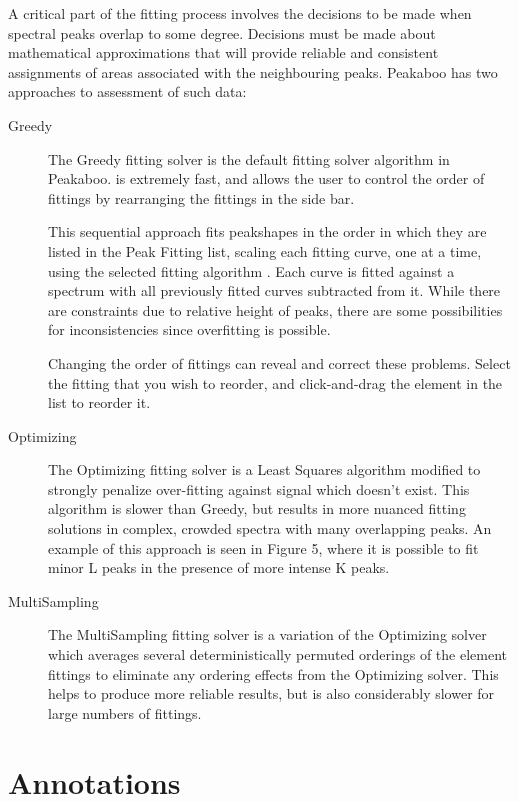 \documentclass[article,twoside,11pt]{report}
\newcommand{\tocsection}[1]{\section*{#1}\addcontentsline{toc}{section}{#1}}
\begin{document}
A critical part of the fitting process involves the decisions to be made when spectral peaks overlap to some degree. Decisions must be made about mathematical approximations that will provide reliable and consistent assignments of areas associated with the neighbouring peaks. Peakaboo has two approaches to assessment of such data: 





\begin{description}

\item [Greedy] The Greedy fitting solver is the default fitting solver algorithm in Peakaboo. is extremely fast, and allows the user to control the order of fittings by rearranging the fittings in the side bar. 

This sequential approach fits peakshapes in the order in which they are listed in the Peak Fitting list, scaling each fitting curve, one at a time, using the selected fitting algorithm . Each curve is fitted against a spectrum with all previously fitted curves subtracted from it. While there are constraints due to relative height of peaks, there are some possibilities for inconsistencies since overfitting is possible. 

Changing the order of fittings can reveal and correct these problems. Select the fitting that you wish to reorder, and click-and-drag the element in the list to reorder it.


\item [Optimizing] The Optimizing fitting solver is a Least Squares algorithm modified to strongly penalize over-fitting against signal which doesn't exist. This algorithm is slower than Greedy, but results in more nuanced fitting solutions in complex, crowded spectra with many overlapping peaks. An example of this approach is seen in Figure 5, where it is possible to fit minor L peaks in the presence of more intense K peaks.

\item [MultiSampling] The MultiSampling fitting solver is a variation of the Optimizing solver which averages several deterministically permuted orderings of the element fittings to eliminate any ordering effects from the Optimizing solver. This helps to produce more reliable results, but is also considerably slower for large numbers of fittings.

\end{description}

\tocsection{Annotations}
\end{document}
